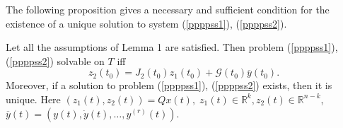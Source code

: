 \documentclass[12pt]{llncs}
\begin{document}
The following proposition gives a necessary and sufficient condition for the existence of a unique solution to system (\ref{ppppss1}), (\ref{ppppss2}). %
\begin{theorem}
Let all the assumptions of Lemma 1 are satisfied. 
Then problem (\ref{ppppss1}), (\ref{ppppss2}) solvable on $T$ iff
\begin{equation}\label{pss55}
z_2(t_0) = 
J_2(t_0)z_1(t_0) + {\mathcal{G}(t_0)}\overline{y}(t_0).
\end{equation}
Moreover, if a solution to problem (\ref{ppppss1}), (\ref{ppppss2}) exists, then it is unique. Here
$(z_1(t), z_2(t)) = Qx(t), \; z_1(t) \in {\mathbb R}^k, z_2(t) \in {\mathbb R}^{n-k}$, $\overline{y}(t) = (y(t), \dot{y}(t), \ldots, y^{(r)}(t))$.
\end{theorem} 


%


\end{document}
